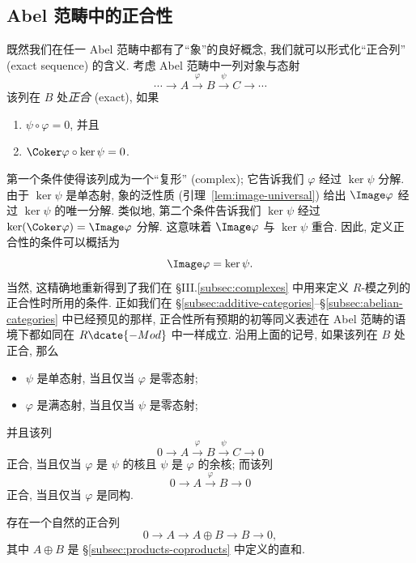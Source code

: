 \subsection{Abel 范畴中的正合性}
\label{subsec:exactness-abelian}

既然我们在任一 Abel 范畴中都有了``象''的良好概念, 我们就可以形式化``正合列'' (exact sequence) 的含义. 考虑 Abel 范畴中一列对象与态射
\[
\cdots \longrightarrow A \xrightarrow{\varphi} B \xrightarrow{\psi} C \longrightarrow \cdots
\]
该列在 $B$ 处\emph{正合} (exact), 如果
\begin{enumerate}
\item[(1)] $\psi\circ\varphi=0$, 并且
\item[(2)] $\Coker\varphi\circ\ker\psi=0$.
\end{enumerate}
第一个条件使得该列成为一个``复形'' (complex); 它告诉我们 $\varphi$ 经过 $\ker\psi$ 分解. 由于 $\ker\psi$ 是单态射, 象的泛性质 (引理~\ref{lem:image-universal}) 给出 $\Image\varphi$ 经过 $\ker\psi$ 的唯一分解. 类似地, 第二个条件告诉我们 $\ker\psi$ 经过 $\ker(\Coker\varphi)=\Image\varphi$ 分解. 这意味着 $\Image\varphi$ 与 $\ker\psi$ 重合. 因此, 定义正合性的条件可以概括为
\[
\Image\varphi=\ker\psi.
\]
当然, 这精确地重新得到了我们在 §III.\ref{subsec:complexes} 中用来定义 $R$-模之列的正合性时所用的条件.
正如我们在 \S\ref{subsec:additive-categories}--\S\ref{subsec:abelian-categories} 中已经预见的那样, 正合性所有预期的初等同义表述在 Abel 范畴的语境下都如同在 $R\dcate{-Mod}$ 中一样成立. 沿用上面的记号, 如果该列在 $B$ 处正合, 那么
\begin{itemize}
\item $\psi$ 是单态射, 当且仅当 $\varphi$ 是零态射;
\item $\varphi$ 是满态射, 当且仅当 $\psi$ 是零态射;
\end{itemize}
并且该列
\[
0\to A\xrightarrow{\varphi} B\xrightarrow{\psi} C\to 0
\]
正合, 当且仅当 $\varphi$ 是 $\psi$ 的核且 $\psi$ 是 $\varphi$ 的余核; 而该列
\[
0\to A\xrightarrow{\varphi} B\to 0
\]
正合, 当且仅当 $\varphi$ 是同构.

\begin{example}\label{ex:exact-seq-direct-sum}
存在一个自然的正合列
\[
0\to A\to A\oplus B\to B\to 0,
\]
其中 $A\oplus B$ 是 \S\ref{subsec:products-coproducts} 中定义的直和.
\end{example}

